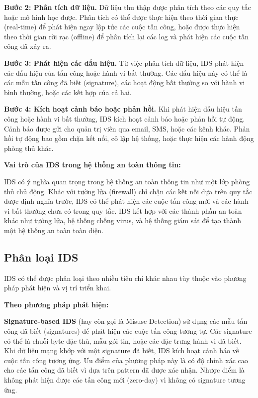 \textbf{Bước 2: Phân tích dữ liệu.} Dữ liệu thu thập được phân tích theo các quy tắc hoặc mô hình học được. Phân tích có thể được thực hiện theo thời gian thực (real-time) để phát hiện ngay lập tức các cuộc tấn công, hoặc được thực hiện theo thời gian rời rạc (offline) để phân tích lại các log và phát hiện các cuộc tấn công đã xảy ra.

\textbf{Bước 3: Phát hiện các dấu hiệu.} Từ việc phân tích dữ liệu, IDS phát hiện các dấu hiệu của tấn công hoặc hành vi bất thường. Các dấu hiệu này có thể là các mẫu tấn công đã biết (signature), các hoạt động bất thường so với hành vi bình thường, hoặc các kết hợp của cả hai.

\textbf{Bước 4: Kích hoạt cảnh báo hoặc phản hồi.} Khi phát hiện dấu hiệu tấn công hoặc hành vi bất thường, IDS kích hoạt cảnh báo hoặc phản hồi tự động. Cảnh báo được gửi cho quản trị viên qua email, SMS, hoặc các kênh khác. Phản hồi tự động bao gồm chặn kết nối, cô lập hệ thống, hoặc thực hiện các hành động phòng thủ khác.

\textbf{Vai trò của IDS trong hệ thống an toàn thông tin:}

IDS có ý nghĩa quan trọng trong hệ thống an toàn thông tin như một lớp phòng thủ chủ động. Khác với tường lửa (firewall) chỉ chặn các kết nối dựa trên quy tắc được định nghĩa trước, IDS có thể phát hiện các cuộc tấn công mới và các hành vi bất thường chưa có trong quy tắc. IDS kết hợp với các thành phần an toàn khác như tường lửa, hệ thống chống virus, và hệ thống giám sát để tạo thành một hệ thống an toàn toàn diện.

\subsection{Phân loại IDS}
IDS có thể được phân loại theo nhiều tiêu chí khác nhau tùy thuộc vào phương pháp phát hiện và vị trí triển khai.

\textbf{Theo phương pháp phát hiện:}

\textbf{Signature-based IDS} (hay còn gọi là Misuse Detection) sử dụng các mẫu tấn công đã biết (signatures) để phát hiện các cuộc tấn công tương tự. Các signature có thể là chuỗi byte đặc thù, mẫu gói tin, hoặc các đặc trưng hành vi đã biết. Khi dữ liệu mạng khớp với một signature đã biết, IDS kích hoạt cảnh báo về cuộc tấn công tương ứng. Ưu điểm của phương pháp này là có độ chính xác cao cho các tấn công đã biết vì dựa trên pattern đã được xác nhận. Nhược điểm là không phát hiện được các tấn công mới (zero-day) vì không có signature tương ứng.

